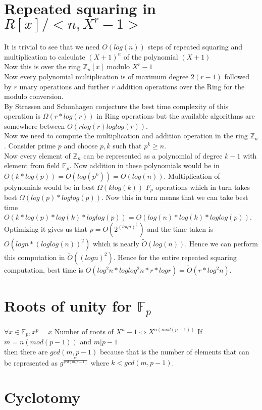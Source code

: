 \documentclass{article}
\begin{document}
\section{Repeated squaring in $R[x]/<n,X^r-1>$}
It is trivial to see that we need $O(log(n))$ steps of repeated squaring and multiplication to calculate $(X+1)^n$ of the polynomial $(X+1)$ \\
Now this is over the ring $\mathbb{Z}_n[x]$ modulo $X^r-1$ \\
Now every polynomial multiplication is of maximum degree $2(r-1)$ followed by $r$ unary operations and further $r$ addition operations over the Ring for the modulo conversion. \\
By Strassen and Schonhagen conjecture the best time complexity of this operation is $\Omega(r*log(r))$ in Ring operations but the available algorithms are somewhere between $O(rlog(r)loglog(r))$. \\
Now we need to compute the multiplication and addition operation in the ring $\mathbb{Z}_n$. Consider prime $p$ and choose $p,k$ such that $p^k \geq n$. \\
Now every element of $\mathbb{Z}_n$ can be represented as a polynomial of degree $k-1$ with element from field $\mathbb{F}_p$. Now addition in these polynomials would be in $O(k*log(p)) = O(log(p^k)) = O(log(n))$. Multiplication of polynomials would be in best $\Omega(klog(k))$ $F_p$ operations which in turn takes best $\Omega(log(p)*loglog(p))$. Now this in turn means that we can take best time $O(k*log(p)*log(k)*loglog(p)) = O(log(n)*log(k)*loglog(p))$. Optimizing it gives us that $p = O(2^{(logn)^{\frac{1}{2}}})$ and the time taken is $O(logn*(loglog(n))^2)$ which is nearly $\widetilde{O}(log(n))$. Hence we can perform this computation in $\widetilde{O}((logn)^2)$. 
Hence for the entire repeated squaring computation, best time is $O(log^2n*loglog^2n*r*logr) = \widetilde{O}(r*log^2n)$.
\section{Roots of unity for $\mathbb{F}_p$}
$\forall x \in \mathbb{F}_p, x^p = x$
Number of roots of $X^n - 1 \Leftrightarrow X^{n(mod(p-1))}$ 
If $m = n(mod(p-1))$ and $m | p-1$
\\ then there are $gcd(m,p-1)$ because that is the number of elements that can be represented as $g^{\frac{kn}{gcd(m,p-1)}}$ where $k < gcd(m,p-1)$.
\section{Cyclotomy}
\end{document}
